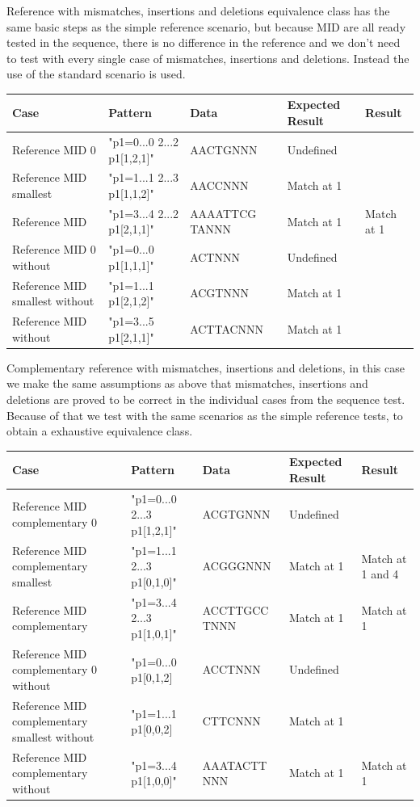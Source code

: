 \documentclass[12pt]{article}
\newcommand{\textapprox}{\raisebox{0.5ex}{\texttildelow}}
\begin{document}
Reference with mismatches, insertions and deletions equivalence class has the same basic steps as the simple reference
scenario, but because MID are all ready tested in the sequence, there is no difference in the reference and we don't
need to test with every single case of mismatches, insertions and deletions. Instead the use of the standard scenario is 
used.
\begin{table}[H]
\begin{tabular}{p{4cm}|p{3cm}|p{2.5cm}|p{2.5cm}|p{2.5cm}}
Case 			& Pattern & Data & Expected Result & Result \\ \hline
Reference MID 0 & "p1=0...0 2...2 p1[1,2,1]" & AACTGNNN & Undefined & \\ \hline
Reference MID smallest & "p1=1...1 2...3 p1[1,1,2]" & AACCNNN & Match at 1 & \\ \hline
Reference MID & "p1=3...4 2...2 p1[2,1,1]" & AAAATTCG TANNN & Match at 1 & Match at 1\\ \hline
Reference MID 0 without & "p1=0...0 p1[1,1,1]" & ACTNNN & Undefined & \\ \hline
Reference MID smallest without & "p1=1...1 p1[2,1,2]" & ACGTNNN & Match at 1 & \\ \hline
Reference MID without & "p1=3...5 p1[2,1,1]" & ACTTACNNN & Match at 1 & \\ \hline
\end{tabular}
\end{table}


Complementary reference with mismatches, insertions and deletions, in this case we make the same assumptions as above
that mismatches, insertions and deletions are proved to be correct in the individual cases from the sequence test.
Because of that we test with the same scenarios as the simple reference tests, to obtain a exhaustive equivalence class.
\begin{table}[H]
\begin{tabular}{p{4cm}|p{3cm}|p{2.5cm}|p{2.5cm}|p{2.5cm}}
Case 			& Pattern & Data & Expected Result & Result \\ \hline
Reference MID complementary 0 & "p1=0...0 2...3 \textapprox p1[1,2,1]" & ACGTGNNN & Undefined & \\ \hline
Reference MID complementary smallest & "p1=1...1 2...3 \textapprox p1[0,1,0]" & ACGGGNNN & Match at 1 & Match at 1 and 4 \\ \hline
Reference MID complementary & "p1=3...4 2...3 \textapprox p1[1,0,1]" & ACCTTGCC TNNN & Match at 1 & Match at 1 \\ \hline
Reference MID complementary 0 without & "p1=0...0 \textapprox p1[0,1,2] & ACCTNNN & Undefined & \\ \hline 
Reference MID complementary smallest without & "p1=1...1 \textapprox p1[0,0,2] & CTTCNNN & Match at 1 & \\ \hline
Reference MID complementary without & "p1=3...4 \textapprox p1[1,0,0]" & AAATACTT NNN & Match at 1 & Match at 1 \\ \hline
\end{tabular}
\end{table}
\end{document}

